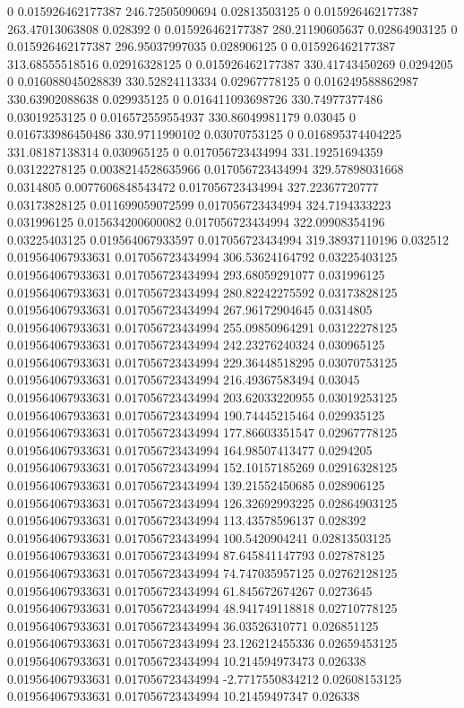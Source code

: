 0 0.015926462177387 246.72505090694 0.02813503125
0 0.015926462177387 263.47013063808 0.028392
0 0.015926462177387 280.21190605637 0.02864903125
0 0.015926462177387 296.95037997035 0.028906125
0 0.015926462177387 313.68555518516 0.02916328125
0 0.015926462177387 330.41743450269 0.0294205
0 0.016088045028839 330.52824113334 0.02967778125
0 0.016249588862987 330.63902088638 0.029935125
0 0.016411093698726 330.74977377486 0.03019253125
0 0.016572559554937 330.86049981179 0.03045
0 0.016733986450486 330.9711990102 0.03070753125
0 0.016895374404225 331.08187138314 0.030965125
0 0.017056723434994 331.19251694359 0.03122278125
0.0038214528635966 0.017056723434994 329.57898031668 0.0314805
0.0077606848543472 0.017056723434994 327.22367720777 0.03173828125
0.011699059072599 0.017056723434994 324.7194333223 0.031996125
0.015634200600082 0.017056723434994 322.09908354196 0.03225403125
0.019564067933597 0.017056723434994 319.38937110196 0.032512
0.019564067933631 0.017056723434994 306.53624164792 0.03225403125
0.019564067933631 0.017056723434994 293.68059291077 0.031996125
0.019564067933631 0.017056723434994 280.82242275592 0.03173828125
0.019564067933631 0.017056723434994 267.96172904645 0.0314805
0.019564067933631 0.017056723434994 255.09850964291 0.03122278125
0.019564067933631 0.017056723434994 242.23276240324 0.030965125
0.019564067933631 0.017056723434994 229.36448518295 0.03070753125
0.019564067933631 0.017056723434994 216.49367583494 0.03045
0.019564067933631 0.017056723434994 203.62033220955 0.03019253125
0.019564067933631 0.017056723434994 190.74445215464 0.029935125
0.019564067933631 0.017056723434994 177.86603351547 0.02967778125
0.019564067933631 0.017056723434994 164.98507413477 0.0294205
0.019564067933631 0.017056723434994 152.10157185269 0.02916328125
0.019564067933631 0.017056723434994 139.21552450685 0.028906125
0.019564067933631 0.017056723434994 126.32692993225 0.02864903125
0.019564067933631 0.017056723434994 113.43578596137 0.028392
0.019564067933631 0.017056723434994 100.5420904241 0.02813503125
0.019564067933631 0.017056723434994 87.645841147793 0.027878125
0.019564067933631 0.017056723434994 74.747035957125 0.02762128125
0.019564067933631 0.017056723434994 61.845672674267 0.0273645
0.019564067933631 0.017056723434994 48.941749118818 0.02710778125
0.019564067933631 0.017056723434994 36.03526310771 0.026851125
0.019564067933631 0.017056723434994 23.126212455336 0.02659453125
0.019564067933631 0.017056723434994 10.214594973473 0.026338
0.019564067933631 0.017056723434994 -2.7717550834212 0.02608153125
0.019564067933631 0.017056723434994 10.21459497347 0.026338
